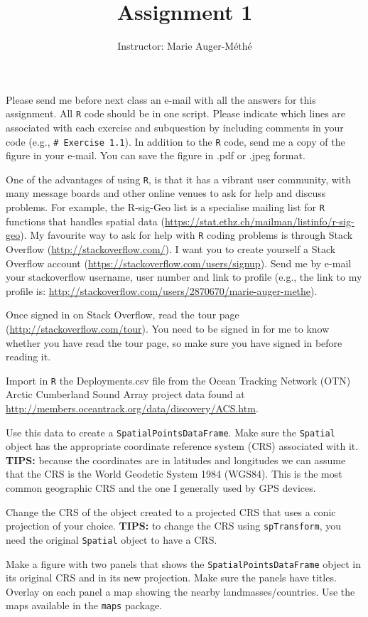 \documentclass[11pt, oneside]{article}   	%
\title{Assignment 1}
\author{Instructor: Marie Auger-M\'eth\'e}
\date{}							%
\begin{document}
\maketitle

Please send me before next class an e-mail with all the answers for this assignment. All \texttt{R} code should be in one script. Please indicate which lines are associated with each exercise and subquestion by including comments in your code (e.g., \texttt{\# Exercise 1.1}). In addition to the \texttt{R} code, send me a copy of the figure in your e-mail. You can save the figure in .pdf or .jpeg format. 

\begin{Exercise}
One of the advantages of using \texttt{R}, is that it has a vibrant user community, with many message boards and other online venues to ask for help and discuss problems. For example, the R-sig-Geo list is a specialise mailing list for \texttt{R} functions that handles spatial data (\url{https://stat.ethz.ch/mailman/listinfo/r-sig-geo}). 
\Question My favourite way to ask for help with \texttt{R} coding problems is through Stack Overflow (\url{http://stackoverflow.com/}). I want you to create yourself a Stack Overflow account (\url{https://stackoverflow.com/users/signup}). Send me by e-mail your stackoverflow username, user number and link to profile (e.g., the link to my profile is: \url{http://stackoverflow.com/users/2870670/marie-auger-methe}). 

\Question Once signed in on Stack Overflow, read the tour page (\url{http://stackoverflow.com/tour}). You need to be signed in for me to know whether you have read the tour page, so make sure you have signed in before reading it. 
\end{Exercise}

\begin{Exercise}
Import in \texttt{R} the Deployments.csv file from the Ocean Tracking Network (OTN) Arctic Cumberland Sound Array project data found at \url{http://members.oceantrack.org/data/discovery/ACS.htm}. 

\Question Use this data to create a \texttt{SpatialPointsDataFrame}. Make sure the \texttt{Spatial} object has the appropriate coordinate reference system (CRS) associated with it. \textbf{TIPS:} because the coordinates are in latitudes and longitudes we can assume that the CRS is the World Geodetic System 1984 (WGS84). This is the most common geographic CRS  and the one I generally used by GPS devices.

\Question Change the CRS of the object created to a projected CRS that uses a conic projection of your choice. \textbf{TIPS:} to change the CRS using \texttt{spTransform}, you need the original \texttt{Spatial} object to have a CRS.

\Question Make a figure with two panels that shows the \texttt{SpatialPointsDataFrame} object in its original CRS and in its new projection. Make sure the panels have titles. Overlay on each panel a map showing the nearby landmasses/countries. Use the maps available in the \texttt{maps} package.
\end{Exercise}
\end{document}
